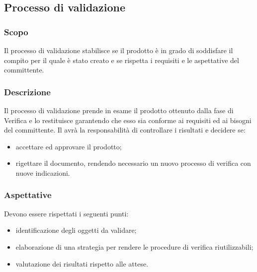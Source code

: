 \subsection{Processo di validazione}
\subsubsection{Scopo}
Il processo di validazione stabilisce se il prodotto è in grado di soddisfare il compito per il quale è stato creato e se rispetta i requisiti e le aspettative del committente.
\subsubsection{Descrizione}
Il processo di validazione prende in esame il prodotto ottenuto dalla fase di Verifica e lo restituisce garantendo che esso sia conforme ai requisiti ed ai bisogni del committente.
Il \RdP{} avrà la responsabilità di controllare i risultati e decidere se:
\begin{itemize}
	\item accettare ed approvare il prodotto;
	\item rigettare il documento, rendendo necessario un nuovo processo di verifica con nuove indicazioni.
\end{itemize}
\subsubsection{Aspettative}
Devono essere rispettati i seguenti punti:
\begin{itemize}
	\item identificazione degli oggetti da validare;
	\item elaborazione di una strategia per rendere le procedure di verifica riutilizzabili;
	\item valutazione dei risultati rispetto alle attese.
\end{itemize}

